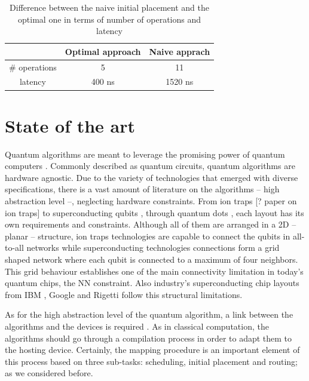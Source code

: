 \begin{table}[htbp]
\caption{\label{tab:org6d8154e}
Difference between the naive initial placement and the optimal one in terms of number of operations and latency}
\centering
\begin{tabular}{ccc}
\hline
 & Optimal approach & Naive apprach\\
\hline
\# operations & 5 & 11\\
latency & 400 ns & 1520 ns\\
\hline
\end{tabular}
\end{table}

\section*{State of the art}
\label{sec:orgc5887c3}

Quantum algorithms are meant to leverage the promising power of quantum computers \cite{coles18:quant_algor_implem_begin}.
Commonly described as quantum circuits, quantum algorithms are hardware agnostic.
Due to the variety of technologies that emerged with diverse specifications, there is a vast amount of literature on the algorithms -- high abstraction level --, neglecting hardware constraints.
From ion traps [? paper on ion traps] to superconducting qubits \cite{Barends_2014,Versluis_2017}, through quantum dots \cite{Hill_2015,Li_2018}, each layout has its own requirements and constraints.
Although all of them are arranged in a 2D -- planar -- structure, ion traps technologies are capable to connect the qubits in all-to-all networks while superconducting technologies connections form a grid shaped network where each qubit is connected to a maximum of four neighbors.
This grid behaviour establishes one of the main connectivity limitation in today's quantum chips, the NN constraint.
Also industry's superconducting chip layouts from IBM \cite{IBM_QX}, Google \cite{boixo16:charac_quant_suprem_near_term_devic} and Rigetti \cite{Sete_2016} follow this structural limitations.

As for the high abstraction level of the quantum algorithm, a link between the algorithms and the devices is required \cite{Fu_2016}.
As in classical computation, the algorithms should go through a compilation process in order to adapt them to the hosting device.
Certainly, the mapping procedure is an important element of this process based on three sub-tasks: scheduling, initial placement and routing; as we considered before.

